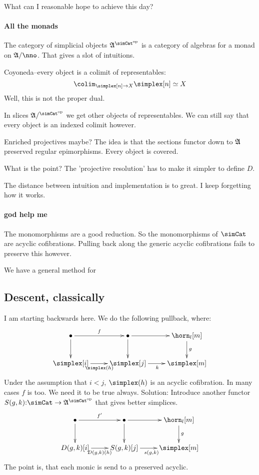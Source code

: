 \documentclass[csh.tex]{subfiles}
\begin{document}
What can I reasonable hope to achieve this day?




\paragraph{All the monads}
The category of simplicial objects $\ambient\s$ is a category of algebras for a monad on $\ambient/\nno$. That gives a slot of intuitions.

Coyoneda--every object is a colimit of representables:
\[
\colim_{\simplex[n] \to X} \simplex[n] \simeq X
\]
Well, this is not the proper dual.

In slices $\ambient/\s$ we get other objects of representables.
We can still say that every object is an indexed colimit however.

Enriched projectives maybe?
The idea is that the sections functor down to $\mathfrak A$ preserved regular epimorphisms. Every object is covered.

What is the point? The 'projective resolution' has to make it simpler to define $D$.

The distance between intuition and implementation is to great. I keep
forgetting how it works.

\paragraph{god help me}
The monomorphisms are a good reduction. So the monomorphisms of $\simCat$ are acyclic cofibrations. Pulling back along the generic acyclic cofibrations fails to preserve this however.

We have a general method for 


\subsection{Descent, classically}
I am starting backwards here. We do the following pullback, where:
\[\xymatrix{
\bullet\ar[r]^f\ar[d] &\bullet\ar[r]\ar[d] & \horn_l[m]\ar[d]^g\\
\simplex[i]\ar[r]_{\simplex(h)} & \simplex[j]\ar[r]_k & \simplex[m]
}\]
Under the assumption that $i<j$, $\simplex(h)$ is an acyclic cofibration. In many cases $f$ is too. We need it to be true always. Solution:
Introduce another functor $S(g,k)\of\simCat \to \ambient\s$ that gives better simplices.
\[\xymatrix{
\bullet\ar[r]^{f'}\ar[d] &\bullet\ar[r]\ar[d] & \horn_l[m]\ar[d]^g\\
D(g,k)[i]\ar[r]_{D(g,k)(h)} & S(g,k)[j]\ar[r]_{s(g,k)} & \simplex[m]
}\]
The point is, that each monic is send to a preserved acyclic.
\end{document}
